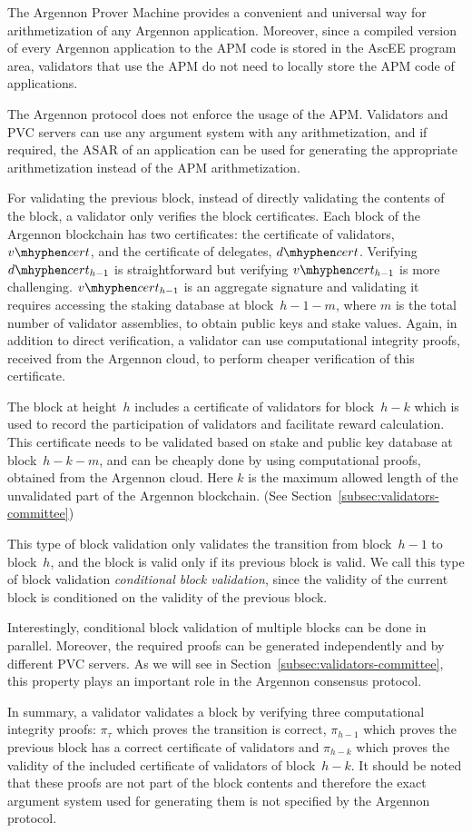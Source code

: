 The Argennon Prover Machine provides a convenient and universal way for arithmetization of any Argennon
application. Moreover, since a compiled version of every Argennon application to the APM code is stored in the AscEE
program area, validators that use the APM do not need to locally store the APM code of applications.

The Argennon protocol does not enforce the usage of the APM. Validators and PVC servers can use any argument system
with any arithmetization, and if required, the ASAR of an application can be used
for generating the appropriate arithmetization instead of the APM arithmetization.

For validating the previous block, instead of directly validating the contents of the block, a validator only
verifies the block certificates. Each block of the Argennon blockchain has two certificates: the certificate of
validators, $v \mhyphen cert$, and the certificate of delegates, $d \mhyphen cert$. Verifying $d \mhyphen
cert_{h-1}$ is straightforward but verifying $v \mhyphen cert_{h-1}$ is more challenging. $v \mhyphen cert_{h-1}$ is an
aggregate signature and validating it requires accessing the staking database at block~$h-1-m$, where $m$ is the
total number of validator assemblies, to obtain public keys and stake values. Again, in addition to direct
verification, a validator can use computational integrity proofs, received from the Argennon cloud, to perform
cheaper verification of this certificate.

The block at height~$h$ includes a certificate of validators for block~$h-k$ which is used to record the participation
of validators and facilitate reward calculation. This certificate needs to be validated based on stake and public key
database at block~$h-k-m$, and can be cheaply done by using computational proofs, obtained from the Argennon cloud.
Here $k$ is the maximum allowed length of the unvalidated part of the Argennon blockchain. (See
Section~\ref{subsec:validators-committee})

This type of block validation only validates the transition from block~$h-1$ to block~$h$, and the block is valid
only if its previous block is valid. We
call this type of block validation \emph{conditional block validation}, since the validity of the current block is
conditioned on the validity of the previous block.

Interestingly, conditional block validation of multiple blocks can be done in parallel. Moreover, the required proofs
can be generated independently and by different PVC servers. As we will see in
Section~\ref{subsec:validators-committee}, this property plays an important role in the Argennon consensus protocol.

In summary, a validator validates a block by verifying three computational integrity proofs: $\pi_{\tau}$ which proves
the transition is correct, $\pi_{h-1}$ which proves the previous block has a correct certificate of validators and
$\pi_{h-k}$ which proves the validity of the included certificate of validators of block~$h-k$. It should be noted that
these proofs are not part of the block contents and therefore the exact argument system used for generating them is
not specified by the Argennon protocol.